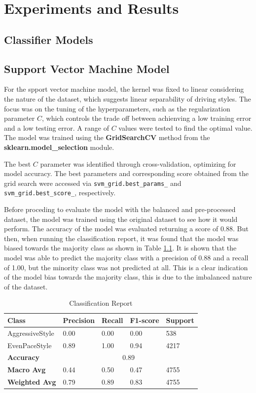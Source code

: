 \chapter{Experiments and Results}

\section{Classifier Models}

\section{Support Vector Machine Model}
For the spport vector machine model, the kernel was fixed to linear considering the nature of the dataset, which suggests linear separability of driving styles. The focus was on the tuning
of the hyperparameters, such as the regularization parameter $C$, which controls the trade off between achienving a low training error and a low testing error. 
A range of $C$ values were tested to find the optimal value. The model was trained using the \textbf{GridSearchCV} method from the \textbf{sklearn.model\_selection} module.

The best $C$ parameter was identified through cross-validation, optimizing for model accuracy. The best parameters and corresponding score obtained from the grid search were 
accessed via \texttt{svm\_grid.best\_params\_} and \texttt{svm\_grid.best\_score\_}, respectively.

Before proceding to evaluate the model with the balanced and pre-processed dataset, the model was trained using the original dataset to see how it would perform. The accuracy of the model
was evaluated returning a score of 0.88. But then, when running the classification report, it was found that the model was biased towards the majority class as shown in 
Table \ref{table:svm_classification_report}.
It is shown that the model was able to predict the majority class with a precision of 0.88 and a recall of 1.00, but the minority class was not predicted at all. This is a clear 
indication of the model bias towards the majority class, this is due to the imbalanced nature of the dataset.

\begin{table}[H]
    \centering
    \begin{tabular}{|l|l|l|l|l|}
    \hline
    \textbf{Class} & \textbf{Precision} & \textbf{Recall} & \textbf{F1-score} & \textbf{Support} \\ \hline
    AggressiveStyle & 0.00 & 0.00 & 0.00 & 538 \\ \hline
    EvenPaceStyle & 0.89 & 1.00 & 0.94 & 4217 \\ \hline
    \textbf{Accuracy} & \multicolumn{4}{c|}{0.89} \\ \hline
    \textbf{Macro Avg} & 0.44 & 0.50 & 0.47 & 4755 \\ \hline
    \textbf{Weighted Avg} & 0.79 & 0.89 & 0.83 & 4755 \\ \hline
    \end{tabular}
    \caption{Classification Report}
    \label{table:svm_classification_report}
\end{table}

